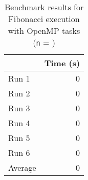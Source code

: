\documentclass[12pt]{article}
\begin{document}
\begin{table}[H]
  \centering
  \begin{tabular}{lr}
    & {\bf Time (s)} \\
    \hline
    Run 1 & 0 \\
    Run 2 & 0 \\
    Run 3 & 0 \\
    Run 4 & 0 \\
    Run 5 & 0 \\
    Run 6 & 0 \\
    \hline
    Average & 0 \\
  \end{tabular}
  \caption{Benchmark results for Fibonacci execution with OpenMP tasks ({\tt n} = \fibNumber{})}
  \label{tbl-fib-tasks}
\end{table}

\end{document}
